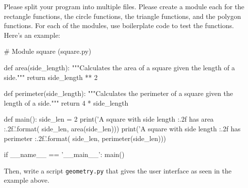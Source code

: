 \documentclass[11pt]{cselabheader}
\begin{document}
\begin{ex}
  Please split your program into multiple files. Please create a module each for
  the rectangle functions, the circle functions, the triangle functions, and the
  polygon functions. For each of the modules, use boilerplate code to test the
  functions. Here's an example:

  \begin{python3code}
# Module square (square.py)

def area(side_length):
    """Calculates the area of a square given the length of a side."""
    return side_length ** 2

def perimeter(side_length):
    """Calculates the perimeter of a square given the length of a side."""
    return 4 * side_length

def main():
    side_len = 2
    print('A square with side length {:.2f} has area {:.2f}.'.format(
        side_len, area(side_len)))
    print('A square with side length {:.2f} has perimeter {:.2f}.'.format(
        side_len, perimeter(side_len)))

if __name__ == '__main__':
    main()
  \end{python3code}

  Then, write a script \texttt{geometry.py} that gives the user interface as
  seen in the example above.


\end{ex}
\end{document}
